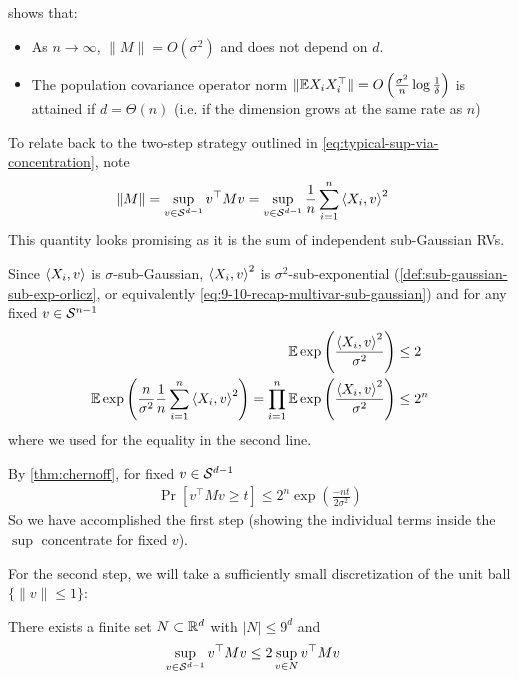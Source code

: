 \begin{remark}
     shows that:
    \begin{itemize}
        \item As $n \to \infty$, $\|M\| = O(\sigma^2)$ and does not depend on $d$.
        \item The population covariance operator norm $\|\mathbb{E} X_i X_i^\top\| = O\left( \frac{\sigma^2}{n} \log \frac{1}{\delta} \right)$ is attained if $d = \Theta(n)$ (i.e. if the dimension grows at the same rate as $n$)
    \end{itemize}
\end{remark}


To relate back to the two-step strategy outlined in \cref{eq:typical-sup-via-concentration}, note
\begin{align}
    \|M\| &= \sup_{v \in \mathcal{S}^{d-1}} v^\top M v
    = \sup_{v \in \mathcal{S}^{d-1}} \frac{1}{n} \sum_{i=1}^n \braket{X_i, v}^2
\end{align}
This quantity looks promising as it is the sum of independent sub-Gaussian RVs.

Since $\braket{X_i, v}$ is $\sigma$-sub-Gaussian, $\braket{X_i, v}^2$ is $\sigma^2$-sub-exponential (\cref{def:sub-gaussian-sub-exp-orlicz}, or equivalently \cref{eq:9-10-recap-multivar-sub-gaussian})
and for any fixed $v \in \mathcal{S}^{n-1}$
\begin{align}
    \mathbb{E} \exp\left(\frac{\braket{X_i, v}^2}{\sigma^2}\right) &\leq 2 \\
    \mathbb{E} \exp\left(\frac{n}{\sigma^2} \frac{1}{n} \sum_{i=1}^n \braket{X_i, v}^2 \right)
    = \prod_{i=1}^n \mathbb{E} \exp \left(\frac{\braket{X_i, v}^2}{\sigma^2}\right)
    &\leq 2^n
\end{align}
where we used  for the equality in the second line.

By \cref{thm:chernoff}, for fixed $v \in \mathcal{S}^{d-1}$
\begin{align}
    \Pr[v^\top M v \geq t] \leq 2^n \exp\left(\frac{-n t}{2 \sigma^2}\right) \label{eq:9-10-conc-sum}
\end{align}
So we have accomplished the first step (showing the individual terms inside the $\sup$ concentrate for fixed $v$).

For the second step, we will take a sufficiently small discretization of the unit ball $\{\|v\|\leq 1\}$:
\begin{lemma}\label{lem:9-10-unit-ball-packing}
    There exists a finite set $N \subset \mathbb{R}^d$ with $\lvert N \rvert \leq 9^d$ and
    \begin{align}
        \sup_{v \in \mathcal{S}^{d-1}} v^\top M v &\leq 2 \sup_{v \in N} v^\top M v
    \end{align}
\end{lemma}

